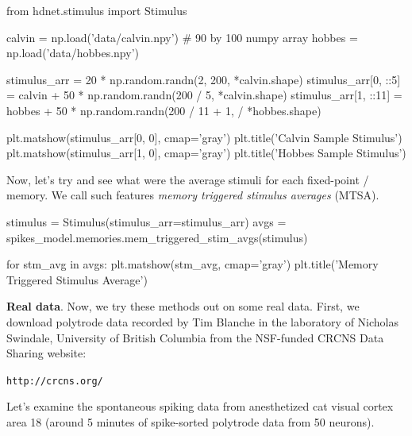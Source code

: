 \documentclass[letter, 12pt]{article}
\theoremstyle{definition}
\theoremstyle{remark}
\begin{document}
\begin{python}
from hdnet.stimulus import Stimulus

calvin = np.load('data/calvin.npy')  # 90 by 100 numpy array
hobbes = np.load('data/hobbes.npy')

stimulus_arr = 20 * np.random.randn(2, 200, *calvin.shape)
stimulus_arr[0, ::5] = calvin + 50 * np.random.randn(200 / 5, *calvin.shape)
stimulus_arr[1, ::11] = hobbes + 50 * np.random.randn(200 / 11 + 1, /
						*hobbes.shape)

plt.matshow(stimulus_arr[0, 0], cmap='gray')
plt.title('Calvin Sample Stimulus')
plt.matshow(stimulus_arr[1, 0], cmap='gray')
plt.title('Hobbes Sample Stimulus')
\end{python}

Now, let's try and see what were the average stimuli for each fixed-point / memory.  We call such features \textit{memory triggered stimulus averages} (MTSA).



\begin{python}
stimulus = Stimulus(stimulus_arr=stimulus_arr)
avgs = spikes_model.memories.mem_triggered_stim_avgs(stimulus)

for stm_avg in avgs:
    plt.matshow(stm_avg, cmap='gray')
    plt.title('Memory Triggered Stimulus Average')
\end{python}


\textbf{Real data}.  Now, we try these methods out on some real data.  First, we download polytrode data recorded by Tim Blanche in the laboratory of Nicholas Swindale, University of British Columbia from the NSF-funded CRCNS Data Sharing website:

\begin{center}
\texttt{http://crcns.org/} \\
\end{center}

Let's examine the spontaneous spiking data from anesthetized cat visual cortex area 18 (around 5 minutes of spike-sorted polytrode data from 50 neurons).

\scriptsize
\setlength{\bibsep}{0pt plus 0.3ex}

 
\end{document}
